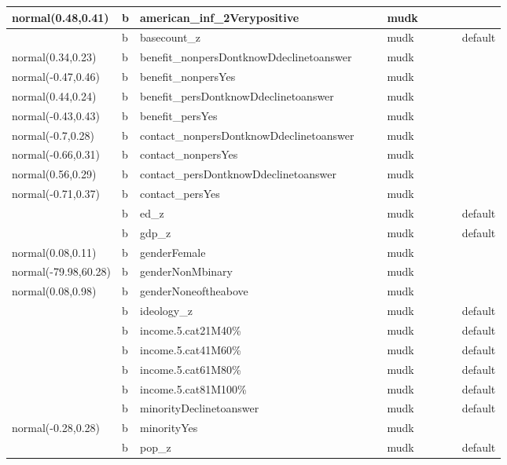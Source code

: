 \documentclass[
]{book}
\theoremstyle{definition}
\theoremstyle{definition}
\theoremstyle{definition}
\theoremstyle{definition}
\theoremstyle{remark}
\begin{document}
\begin{table}
\begin{tabular}[t]{l|l|l|l|l|l|l|l|l|l}
\hline
normal(0.48,0.41) & b & american\_inf\_2Verypositive &  &  & mudk &  &  &  & \\
\hline
 & b & basecount\_z &  &  & mudk &  &  &  & default\\
\hline
normal(0.34,0.23) & b & benefit\_nonpersDontknowDdeclinetoanswer &  &  & mudk &  &  &  & \\
\hline
normal(-0.47,0.46) & b & benefit\_nonpersYes &  &  & mudk &  &  &  & \\
\hline
normal(0.44,0.24) & b & benefit\_persDontknowDdeclinetoanswer &  &  & mudk &  &  &  & \\
\hline
normal(-0.43,0.43) & b & benefit\_persYes &  &  & mudk &  &  &  & \\
\hline
normal(-0.7,0.28) & b & contact\_nonpersDontknowDdeclinetoanswer &  &  & mudk &  &  &  & \\
\hline
normal(-0.66,0.31) & b & contact\_nonpersYes &  &  & mudk &  &  &  & \\
\hline
normal(0.56,0.29) & b & contact\_persDontknowDdeclinetoanswer &  &  & mudk &  &  &  & \\
\hline
normal(-0.71,0.37) & b & contact\_persYes &  &  & mudk &  &  &  & \\
\hline
 & b & ed\_z &  &  & mudk &  &  &  & default\\
\hline
 & b & gdp\_z &  &  & mudk &  &  &  & default\\
\hline
normal(0.08,0.11) & b & genderFemale &  &  & mudk &  &  &  & \\
\hline
normal(-79.98,60.28) & b & genderNonMbinary &  &  & mudk &  &  &  & \\
\hline
normal(0.08,0.98) & b & genderNoneoftheabove &  &  & mudk &  &  &  & \\
\hline
 & b & ideology\_z &  &  & mudk &  &  &  & default\\
\hline
 & b & income.5.cat21M40\% &  &  & mudk &  &  &  & default\\
\hline
 & b & income.5.cat41M60\% &  &  & mudk &  &  &  & default\\
\hline
 & b & income.5.cat61M80\% &  &  & mudk &  &  &  & default\\
\hline
 & b & income.5.cat81M100\% &  &  & mudk &  &  &  & default\\
\hline
 & b & minorityDeclinetoanswer &  &  & mudk &  &  &  & default\\
\hline
normal(-0.28,0.28) & b & minorityYes &  &  & mudk &  &  &  & \\
\hline
 & b & pop\_z &  &  & mudk &  &  &  & default\\

\end{tabular}
\end{table}
\end{document}
